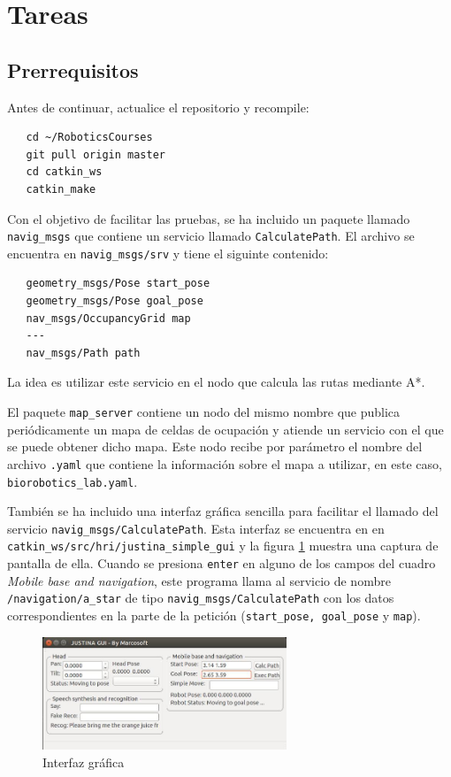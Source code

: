 \documentclass[letterpaper,12pt]{article}
\begin{document}
\section{Tareas}

\subsection{Prerrequisitos}
Antes de continuar, actualice el repositorio y recompile:
\begin{verbatim}
   cd ~/RoboticsCourses
   git pull origin master
   cd catkin_ws
   catkin_make
\end{verbatim}

Con el objetivo de facilitar las pruebas, se ha incluido un paquete llamado \texttt{navig\_msgs} que contiene un servicio llamado \texttt{CalculatePath}. El archivo se encuentra en \texttt{navig\_msgs/srv} y tiene el siguinte contenido:
\begin{verbatim}
   geometry_msgs/Pose start_pose
   geometry_msgs/Pose goal_pose
   nav_msgs/OccupancyGrid map
   ---
   nav_msgs/Path path
\end{verbatim}
La idea es utilizar este servicio en el nodo que calcula las rutas mediante A*. 

El paquete \texttt{map\_server} contiene un nodo del mismo nombre que publica periódicamente un mapa de celdas de ocupación y atiende un servicio con el que se puede obtener dicho mapa. Este nodo recibe por parámetro el nombre del archivo \texttt{.yaml} que contiene la información sobre el mapa a utilizar, en este caso, \texttt{biorobotics\_lab.yaml}. 

También se ha incluido una interfaz gráfica sencilla para facilitar el llamado del servicio \texttt{navig\_msgs/CalculatePath}. Esta interfaz se encuentra en en \texttt{catkin\_ws/src/hri/justina\_simple\_gui} y la figura \ref{fig:gui} muestra una captura de pantalla de ella. Cuando se presiona \texttt{enter} en alguno de los campos del cuadro \textit{Mobile base and navigation}, este programa llama al servicio de nombre \texttt{/navigation/a\_star} de tipo \texttt{navig\_msgs/CalculatePath} con los datos correspondientes en la parte de la petición (\texttt{start\_pose, goal\_pose} y \texttt{map}).
\begin{figure}
\centering
\includegraphics[width=0.65\textwidth]{Figures/gui.jpg}
\caption{Interfaz gráfica}
\label{fig:gui}
\end{figure}
\end{document}
